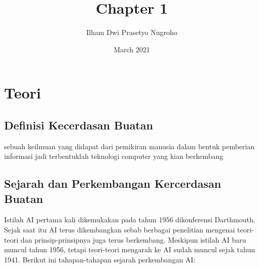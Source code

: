 \documentclass{article}
\title{Chapter 1}
\author{Ilham Dwi Prasetyo Nugroho}
\date{March 2021}
\begin{document}
\maketitle


\section{Teori}
\subsection{Definisi Kecerdasan Buatan}
\hfill\break
sebuah keilmuan yang didapat dari pemikiran manusia dalam bentuk pemberian informasi jadi terbentuklah teknologi computer yang kian berkembang

\subsection{Sejarah dan Perkembangan Kercerdasan Buatan}
\hfill\break
Istilah AI pertama kali dikemukakan pada tahun 1956 dikonferensi Darthmouth. Sejak saat itu AI terus dikembangkan sebab berbagai penelitian mengenai teori-teori dan prinsip-prinsipnya juga terus berkembang. Meskipun istilah AI baru muncul tahun 1956, tetapi teori-teori mengarah ke AI sudah muncul sejak tahun 1941. Berikut ini tahapan-tahapan sejarah perkembangan AI:
\end{document}
